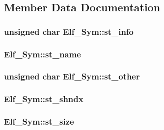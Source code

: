 \subsection{Member Data Documentation}
\hypertarget{struct_elf___sym_acbc297896a6b0c4e54d2509755c1c694}{
\subsubsection[{st\+\_\+info}]{\setlength{\rightskip}{0pt plus 5cm}unsigned char Elf\+\_\+\+Sym\+::st\+\_\+info}}\label{struct_elf___sym_acbc297896a6b0c4e54d2509755c1c694}
\hypertarget{struct_elf___sym_a13b6ad0f2418ed6fa4470503854325b7}{
\subsubsection[{st\+\_\+name}]{ Elf\+\_\+\+Sym\+::st\+\_\+name}}\label{struct_elf___sym_a13b6ad0f2418ed6fa4470503854325b7}
\hypertarget{struct_elf___sym_a418e07c9488c0f57d1e41a3af5f8b4bc}{
\subsubsection[{st\+\_\+other}]{\setlength{\rightskip}{0pt plus 5cm}unsigned char Elf\+\_\+\+Sym\+::st\+\_\+other}}\label{struct_elf___sym_a418e07c9488c0f57d1e41a3af5f8b4bc}
\hypertarget{struct_elf___sym_a7c7c6fa8df5a0e17f3425fb82437a239}{
\subsubsection[{st\+\_\+shndx}]{ Elf\+\_\+\+Sym\+::st\+\_\+shndx}}\label{struct_elf___sym_a7c7c6fa8df5a0e17f3425fb82437a239}
\hypertarget{struct_elf___sym_ab5ec712b8c3619c7f3b88f750580dc5f}{
\subsubsection[{st\+\_\+size}]{ Elf\+\_\+\+Sym\+::st\+\_\+size}}\label{struct_elf___sym_ab5ec712b8c3619c7f3b88f750580dc5f}
